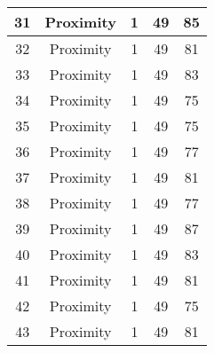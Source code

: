 \documentclass[results.tex]{subfiles}
\begin{document}
\begin{center}
\begin{tabular}{| c || c | c | c | c |}
            \hline
            31                      & Proximity                    & 1                      & 49                      & 85                   \\
            \hline
            32                      & Proximity                    & 1                      & 49                      & 81                   \\
            \hline
            33                      & Proximity                    & 1                      & 49                      & 83                   \\
            \hline
            34                      & Proximity                    & 1                      & 49                      & 75                   \\
            \hline
            35                      & Proximity                    & 1                      & 49                      & 75                   \\
            \hline
            36                      & Proximity                    & 1                      & 49                      & 77                   \\
            \hline
            37                      & Proximity                    & 1                      & 49                      & 81                   \\
            \hline
            38                      & Proximity                    & 1                      & 49                      & 77                   \\
            \hline
            39                      & Proximity                    & 1                      & 49                      & 87                   \\
            \hline
            40                      & Proximity                    & 1                      & 49                      & 83                   \\
            \hline
            41                      & Proximity                    & 1                      & 49                      & 81                   \\
            \hline
            42                      & Proximity                    & 1                      & 49                      & 75                   \\
            \hline
            43                      & Proximity                    & 1                      & 49                      & 81                   \\

\end{tabular}
\end{center}
\end{document}
